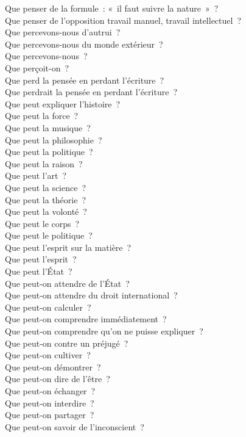 \documentclass[a4paper,12pt]{article}
\begin{document}
Que penser de la formule : « il faut suivre la nature » ? \\
Que penser de l'opposition travail manuel, travail intellectuel ? \\
Que percevons-nous d'autrui ? \\
Que percevons-nous du monde extérieur ? \\
Que percevons-nous ? \\
Que perçoit-on ? \\
Que perd la pensée en perdant l'écriture ? \\
Que perdrait la pensée en perdant l'écriture ? \\
Que peut expliquer l'histoire ? \\
Que peut la force ? \\
Que peut la musique ? \\
Que peut la philosophie ? \\
Que peut la politique ? \\
Que peut la raison ? \\
Que peut l'art ? \\
Que peut la science ? \\
Que peut la théorie ? \\
Que peut la volonté ? \\
Que peut le corps ? \\
Que peut le politique ? \\
Que peut l'esprit sur la matière ? \\
Que peut l'esprit ? \\
Que peut l'État ? \\
Que peut-on attendre de l'État ? \\
Que peut-on attendre du droit international ? \\
Que peut-on calculer ? \\
Que peut-on comprendre immédiatement ? \\
Que peut-on comprendre qu'on ne puisse expliquer ? \\
Que peut-on contre un préjugé ? \\
Que peut-on cultiver ? \\
Que peut-on démontrer ? \\
Que peut-on dire de l'être ? \\
Que peut-on échanger ? \\
Que peut-on interdire ? \\
Que peut-on partager ? \\
Que peut-on savoir de l'inconscient ? \\
\end{document}

